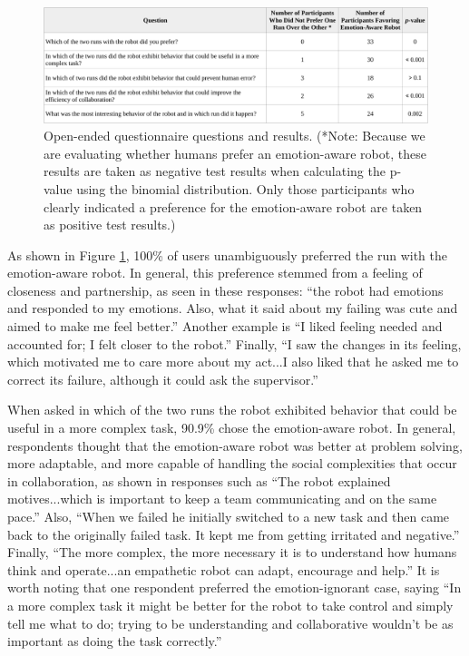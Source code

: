 \documentclass[12pt]{report}
\begin{document}
\begin{figure}[tbh]
\centering
\includegraphics[width=1\textwidth]{figure/table2-croped.pdf}
\caption{\fontsize{10pt}{10pt}\selectfont Open-ended questionnaire questions and
results. (*Note: Because we are evaluating whether humans prefer an
emotion-aware robot, these results are taken as negative test results when
calculating the p-value using the binomial distribution. Only those participants
who clearly indicated a preference for the emotion-aware robot are taken as
positive test results.)}
\label{fig:Open-Ended-Table}
\vspace*{-5mm}
\end{figure}

As shown in Figure \ref{fig:Open-Ended-Table}, 100\% of users unambiguously
preferred the run with the emotion-aware robot. In general, this preference
stemmed from a feeling of closeness and partnership, as seen in these responses:
``the robot had emotions and responded to my emotions. Also, what it said about
my failing was cute and aimed to make me feel better.'' Another example is ``I
liked feeling needed and accounted for; I felt closer to the robot.'' Finally,
``I saw the changes in its feeling, which motivated me to care more about my
act...I also liked that he asked me to correct its failure, although it could
ask the supervisor.''  

When asked in which of the two runs the robot exhibited
behavior that could be useful in a more complex task, 90.9\% chose the
emotion-aware robot. In general, respondents thought that the emotion-aware
robot was better at problem solving, more adaptable, and more capable of
handling the social complexities that occur in collaboration, as shown in
responses such as ``The robot explained motives...which is important to keep a
team communicating and on the same pace.'' Also, ``When we failed he initially
switched to a new task and then came back to the originally failed task. It kept
me from getting irritated and negative.'' Finally, ``The more complex, the more
necessary it is to understand how humans think and operate...an empathetic robot
can adapt, encourage and help.'' It is worth noting that one respondent
preferred the emotion-ignorant case, saying ``In a more complex task it might be
better for the robot to take control and simply tell me what to do; trying to be
understanding and collaborative wouldn't be as important as doing the task
correctly.''
\end{document}
